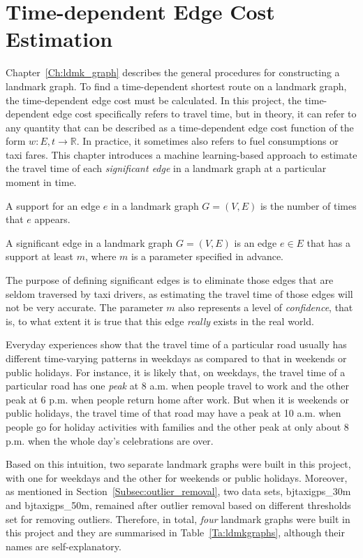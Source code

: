 \chapter{Time-dependent Edge Cost Estimation}\label{Chap:4}
Chapter~\ref{Ch:ldmk_graph} describes the general procedures for constructing a landmark graph. To find a time-dependent shortest route on a landmark graph, the time-dependent edge cost must be calculated. In this project, the time-dependent edge cost specifically refers to travel time, but in theory, it can refer to any quantity that can be described as a time-dependent edge cost function of the form $w : E,t \rightarrow \mathbb{R}$. In practice, it sometimes also refers to fuel consumptions or taxi fares. This chapter introduces a machine learning-based approach to estimate the travel time of each \emph{significant edge} in a landmark graph at a particular moment in time. 

\begin{defn}
A support for an edge $e$ in a landmark graph $G=(V,E)$ is the number of times that $e$ appears. 
\end{defn}

\begin{defn}
A significant edge in a landmark graph $G=(V,E)$ is an edge $e \in E$ that has a support at least $m$, where $m$ is a parameter specified in advance.
\end{defn}

The purpose of defining significant edges is to eliminate those edges that are seldom traversed by taxi drivers, as estimating the travel time of those edges will not be very accurate. The parameter $m$ also represents a level of \emph{confidence}, that is, to what extent it is true that this edge \emph{really} exists in the real world. 

Everyday experiences show that the travel time of a particular road usually has different time-varying patterns in weekdays as compared to that in weekends or public holidays. For instance, it is likely that, on weekdays, the travel time of a particular road has one \emph{peak} at 8 a.m. when people travel to work and the other peak at 6 p.m. when people return home after work. But when it is weekends or public holidays, the travel time of that road may have a peak at 10 a.m. when people go for holiday activities with families and the other peak at only about 8 p.m. when the whole day's celebrations are over. 

Based on this intuition, two separate landmark graphs were built in this project, with one for weekdays and the other for weekends or public holidays. Moreover, as mentioned in Section~\ref{Subsec:outlier_removal}, 
two data sets, bjtaxigps\_30m and bjtaxigps\_50m, remained after outlier removal based on different thresholds set for removing outliers. Therefore, in total, \emph{four} landmark graphs were built in this project and they are summarised in Table~\ref{Ta:ldmkgraphs}, although their names are self-explanatory. 

